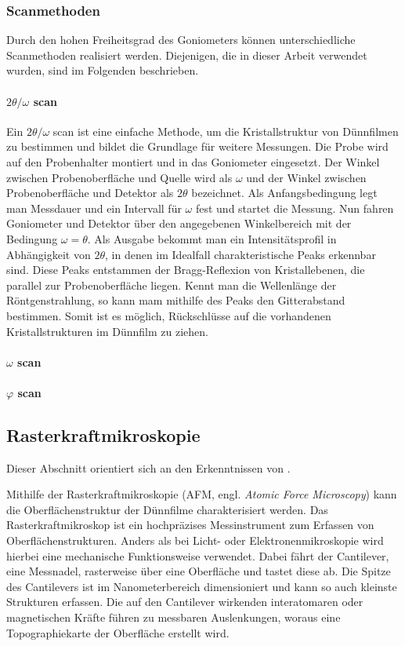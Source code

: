 \subsubsection{Scanmethoden}
Durch den hohen Freiheitsgrad des Goniometers können unterschiedliche Scanmethoden realisiert werden.
Diejenigen, die in dieser Arbeit verwendet wurden, sind im Folgenden beschrieben.

\paragraph{$2\theta/\omega$ scan}
Ein $2\theta/\omega$ scan ist eine einfache Methode, um die Kristallstruktur von Dünnfilmen zu bestimmen
und bildet die Grundlage für weitere Messungen.
Die Probe wird auf den Probenhalter montiert und in das Goniometer eingesetzt.
Der Winkel zwischen Probenoberfläche und Quelle wird als $\omega$ und der Winkel zwischen Probenoberfläche und Detektor
als $2\theta$ bezeichnet.
Als Anfangsbedingung legt man Messdauer und ein Intervall für $\omega$ fest und startet die Messung.
Nun fahren Goniometer und Detektor über den angegebenen Winkelbereich mit der Bedingung $\omega = \theta$.
Als Ausgabe bekommt man ein Intensitätsprofil in Abhängigkeit von $2\theta$, in denen im Idealfall charakteristische
Peaks erkennbar sind.
Diese Peaks entstammen der Bragg-Reflexion von Kristallebenen, die parallel zur Probenoberfläche liegen.
Kennt man die Wellenlänge der Röntgenstrahlung, so kann mam mithilfe des Peaks den Gitterabstand bestimmen.
Somit ist es möglich, Rückschlüsse auf die vorhandenen Kristallstrukturen im Dünnfilm zu ziehen.

\paragraph{$\omega$ scan}

\paragraph{$\varphi$ scan}
\newpage

\subsection{Rasterkraftmikroskopie}\label{subsec:afm}
Dieser Abschnitt orientiert sich an den Erkenntnissen von  \autocite{afm-buch}.

Mithilfe der Rasterkraftmikroskopie (AFM, engl. \textit{Atomic Force Microscopy}) kann die Oberflächenstruktur der
Dünnfilme charakterisiert werden.
Das Rasterkraftmikroskop ist ein hochpräzises Messinstrument zum Erfassen von Oberflächenstrukturen.
Anders als bei Licht- oder Elektronenmikroskopie wird hierbei eine mechanische Funktionsweise verwendet.
Dabei fährt der Cantilever, eine Messnadel, rasterweise über eine Oberfläche und tastet diese ab.
Die Spitze des Cantilevers ist im Nanometerbereich dimensioniert und kann so auch kleinste Strukturen erfassen.
Die auf den Cantilever wirkenden interatomaren oder magnetischen Kräfte führen zu messbaren Auslenkungen,
woraus eine Topographiekarte der Oberfläche erstellt wird.

